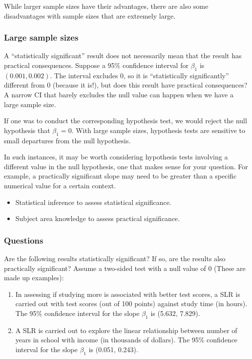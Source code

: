 \documentclass[
]{book}
\providecommand{\tightlist}{%
  \setlength{\itemsep}{0pt}\setlength{\parskip}{0pt}}
\begin{document}
While larger sample sizes have their advantages, there are also some disadvantages with sample sizes that are extremely large.

\subsubsection{Large sample sizes}\label{large-sample-sizes}

A ``statistically significant'' result does not necessarily mean that the result has practical consequences. Suppose a 95\% confidence interval for \(\beta_1\) is \((0.001, 0.002)\). The interval excludes 0, so it is ``statistically significantly'' different from 0 (because it is!), but does this result have practical consequences? A narrow CI that barely excludes the null value can happen when we have a large sample size.

If one was to conduct the corresponding hypothesis test, we would reject the null hypothesis that \(\beta_1 = 0\). With large sample sizes, hypothesis tests are sensitive to small departures from the null hypothesis.

In such instances, it may be worth considering hypothesis tests involving a different value in the null hypothesis, one that makes sense for your question. For example, a practically significant slope may need to be greater than a specific numerical value for a certain context.

\begin{itemize}
\tightlist
\item
  Statistical inference to assess statistical significance.
\item
  Subject area knowledge to assess practical significance.
\end{itemize}

\subsubsection{Questions}\label{questions}

Are the following results statistically significant? If so, are the results also practically significant? Assume a two-sided test with a null value of 0 (These are made up examples):

\begin{enumerate}
\def\labelenumi{\arabic{enumi}.}
\item
  In assessing if studying more is associated with better test scores, a SLR is carried out with test scores (out of 100 points) against study time (in hours). The 95\% confidence interval for the slope \(\beta_1\) is (5.632, 7.829).
\item
  A SLR is carried out to explore the linear relationship between number of years in school with income (in thousands of dollars). The 95\% confidence interval for the slope \(\beta_1\) is (0.051, 0.243).
\end{enumerate}
\end{document}
